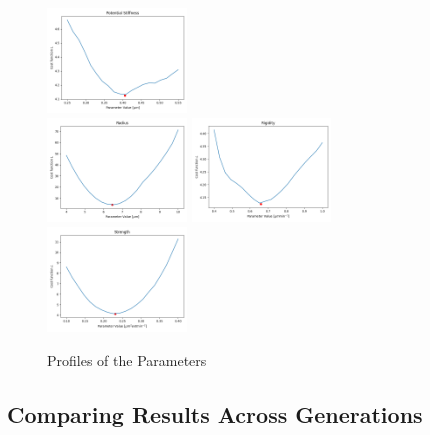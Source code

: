 \documentclass{article}
\begin{document}
\begin{figure}
    \includegraphics[width=0.33\textwidth]
        {../docs/source/_static/fitting-methods/estimate-parameters1/Potential Stiffness.png}\\
    \includegraphics[width=0.33\textwidth]
        {../docs/source/_static/fitting-methods/estimate-parameters1/Radius.png}%
    \includegraphics[width=0.33\textwidth]
        {../docs/source/_static/fitting-methods/estimate-parameters1/Rigidity.png}%
    \includegraphics[width=0.33\textwidth]
        {../docs/source/_static/fitting-methods/estimate-parameters1/Strength.png}%
    \caption{Profiles of the Parameters}
    \label{fig:parameter-estimates-single-step}
\end{figure}

\subsection{Comparing Results Across Generations}
\end{document}
